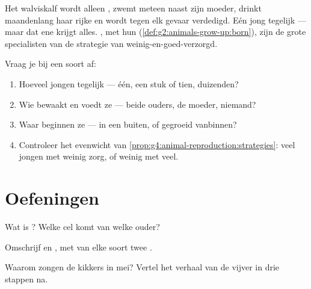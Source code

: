 \begin{example}\label{ex:g4:animal-reproduction:whalecalf}
Het walviskalf wordt alleen , zwemt meteen naast zijn moeder,
drinkt maandenlang haar rijke  en wordt tegen elk gevaar verdedigd.
Eén jong tegelijk --- maar dat ene krijgt alles. , met hun
 (\cref{def:g2:animals-grow-up:born}), zijn de grote specialisten
van de strategie van weinig-en-goed-verzorgd.
\end{example}

\begin{method}\label{met:g4:animal-reproduction:read}
Vraag je bij een soort af:
\begin{enumerate}
  \item Hoeveel jongen tegelijk --- één, een stuk of tien, duizenden?
  \item Wie bewaakt en voedt ze --- beide ouders, de moeder, niemand?
  \item Waar beginnen ze --- in een  buiten, of gegroeid vanbinnen?
  \item Controleer het evenwicht van
        \cref{prop:g4:animal-reproduction:strategies}: veel jongen met
        weinig zorg, of weinig met veel.
\end{enumerate}
\end{method}

\section{Oefeningen}

\begin{exercise}[$\star$]\label{exo:g4:animal-reproduction:1}
Wat is ? Welke cel komt van welke ouder?
\end{exercise}

\begin{exercise}[$\star$]\label{exo:g4:animal-reproduction:2}
Omschrijf  en , met van elke soort twee .
\end{exercise}

\begin{exercise}[$\star$]\label{exo:g4:animal-reproduction:3}
Waarom zongen de kikkers in mei? Vertel het verhaal van de vijver in
drie stappen na.
\end{exercise}

